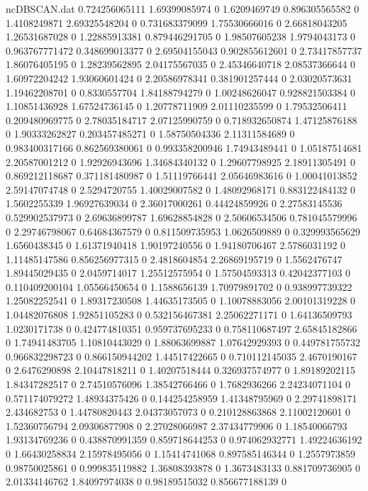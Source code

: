 \begin{filecontents}{ncDBSCAN.dat}
0.724256065111 1.69399085974 0
1.6209469749 0.896305565582 0
1.4108249871 2.69325548204 0
0.731683379099 1.75530666016 0
2.66818043205 1.26531687028 0
1.22885913381 0.879446291705 0
1.98507605238 1.9794043173 0
0.963767771472 0.348699013377 0
2.69504155043 0.902855612601 0
2.73417857737 1.86076405195 0
1.28239562895 2.04175567035 0
2.45346640718 2.08537366644 0
1.60972204242 1.93060601424 0
2.20586978341 0.381901257444 0
2.03020573631 1.19462208701 0
0.8330557704 1.84188794279 0
1.00248626047 0.928821503384 0
1.10851436928 1.67524736145 0
1.20778711909 2.01110235599 0
1.79532506411 0.209480969775 0
2.78035184717 2.07125990759 0
0.718932650874 1.47125876188 0
1.90333262827 0.203457485271 0
1.58750504336 2.11311584689 0
0.983400317166 0.862569380061 0
0.993358200946 1.74943489441 0
1.05187514681 2.20587001212 0
1.92926943696 1.34684340132 0
1.29607798925 2.18911305491 0
0.869212118687 0.371181480987 0
1.51119766441 2.05646983616 0
1.00041013852 2.59147074748 0
2.5294720755 1.40029007582 0
1.48092968171 0.883122484132 0
1.5602255339 1.96927639034 0
2.36017000261 0.44424859926 0
2.27583145536 0.529902537973 0
2.69636899787 1.69628854828 0
2.50606534506 0.781045579996 0
2.29746798067 0.64684367579 0
0.811509735953 1.0626509889 0
0.329993565629 1.6560438345 0
1.61371940418 1.90197240556 0
1.94180706467 2.5786031192 0
1.11485147586 0.856256977315 0
2.4818604854 2.26869195719 0
1.5562476747 1.89445029435 0
2.0459714017 1.25512575954 0
1.57504593313 0.42042377103 0
0.110409200104 1.05566450654 0
1.1588656139 1.70979891702 0
0.938997739322 1.25082252541 0
1.89317230508 1.44635173505 0
1.10078883056 2.00101319228 0
1.04482076808 1.92851105283 0
0.532156467381 2.25062271171 0
1.64136509793 1.0230171738 0
0.424774810351 0.959737695233 0
0.758110687497 2.65845182866 0
1.74941483705 1.10810443029 0
1.88063699887 1.07642929393 0
0.449781755732 0.966832298723 0
0.866150944202 1.44517422665 0
0.710112145035 2.4670190167 0
2.6476290898 2.10447818211 0
1.40207518444 0.326937574977 0
1.89189202115 1.84347282517 0
2.74510576096 1.38542766466 0
1.7682936266 2.24234071104 0
0.571174079272 1.48934375426 0
0.144254258959 1.41348795969 0
2.29741898171 2.434682753 0
1.44780820443 2.04373057073 0
0.210128863868 2.11002120601 0
1.52360756794 2.09306877908 0
2.27028066987 2.37434779906 0
1.18540066793 1.93134769236 0
0.438870991359 0.859718644253 0
0.974062932771 1.49224636192 0
1.66430258834 2.15978495056 0
1.15414741068 0.897585146344 0
1.2557973859 0.98750025861 0
0.999835119882 1.36808393878 0
1.3673483133 0.881709736905 0
2.01334146762 1.84097974038 0
0.98189515032 0.856677188139 0

\end{filecontents}
